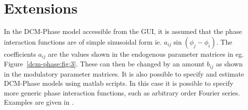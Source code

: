 \section{Extensions}

In the DCM-Phase model accessible from the GUI, it is assumed that the phase interaction functions are of simple sinusoidal form ie. $a_{ij} \sin(\phi_j - \phi_i)$. The coefficients $a_{ij}$ are the values shown in the endogenous 
parameter matrices in eg. Figure~\ref{dcm-phase:fig:3}. These can then be changed by an amount $b_{ij}$ as shown in the modulatory parameter matrices. 
It is also possible to specify and estimate DCM-Phase models using matlab scripts. In this case it is possible to specify more generic phase interaction functions, such as arbitrary order Fourier series. Examples are given in \cite{dcm_phase}.
